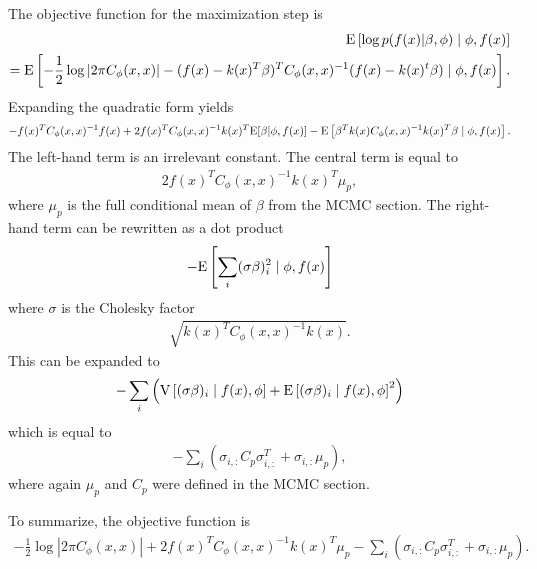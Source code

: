 \documentclass[a4paper]{article}
\begin{document}
The objective function for the maximization step is
\begin{eqnarray*}
    \textup{E}\left[\log p(f(x)|\beta,\phi)\mid\phi, f(x)\right] \\
    = \textup{E}\left[-\frac{1}{2}\log\left|2\pi C_\phi(x,x)\right|
        - (f(x)-k(x)^T\beta)^TC_\phi(x,x)^{-1}(f(x)-k(x)^t\beta)\mid \phi, f(x)\right].
\end{eqnarray*}
Expanding the quadratic form yields
\begin{eqnarray*}
    -f(x)^TC_\phi(x,x)^{-1}f(x) + 2f(x)^TC_\phi(x,x)^{-1}k(x)^T\textup{E}[\beta|\phi,f(x)]-\textup{E}\left[\beta^Tk(x)C_\phi(x,x)^{-1}k(x)^T\beta\mid\phi,f(x)\right].
\end{eqnarray*}
The left-hand term is an irrelevant constant. The central term is equal to
\begin{eqnarray*}
    2f(x)^TC_\phi(x,x)^{-1}k(x)^T\mu_p,
\end{eqnarray*}
where $\mu_p$ is the full conditional mean of $\beta$ from the MCMC section. The right-hand term can be rewritten as a dot product
\begin{eqnarray*}
    -\textup E\left[\sum_i (\sigma\beta)_i^2\mid \phi, f(x)\right]
\end{eqnarray*}
where $\sigma$ is the Cholesky factor
\begin{eqnarray*}
    \sqrt{k(x)^TC_\phi(x,x)^{-1}k(x)}.
\end{eqnarray*}
This can be expanded to
\begin{eqnarray*}
    -\sum_i \left(\textup V\left[(\sigma \beta)_i\mid f(x), \phi\right] + \textup E\left[(\sigma \beta)_i\mid f(x),\phi\right]^2\right)
\end{eqnarray*}
which is equal to
\begin{eqnarray*}
    -\sum_i \left( \sigma_{i,:}C_p\sigma_{i,:}^T + \sigma_{i,:}\mu_p\right),
\end{eqnarray*}
where again $\mu_p$ and $C_p$ were defined in the MCMC section.

To summarize, the objective function is
\begin{eqnarray*}
    -\frac{1}{2}\log\left|2\pi C_\phi(x,x)\right|+2f(x)^TC_\phi(x,x)^{-1}k(x)^T\mu_p-\sum_i \left( \sigma_{i,:}C_p\sigma_{i,:}^T + \sigma_{i,:}\mu_p\right).
\end{eqnarray*}

\end{document}
